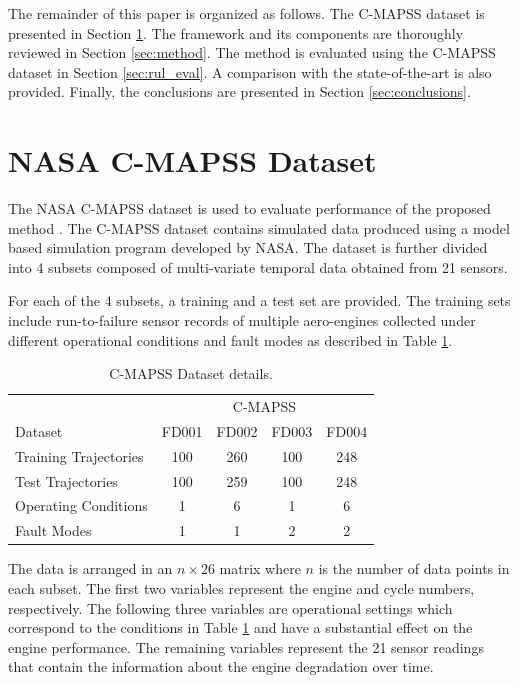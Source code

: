 \documentclass[preprint,12pt]{elsarticle}%
\begin{document}
The remainder of this paper is organized as follows. The C-MAPSS dataset is
presented in Section \ref{sec:rul_dataset}. The framework and its components
are thoroughly reviewed in Section \ref{sec:method}. The method is evaluated
using the C-MAPSS dataset in Section \ref{sec:rul_eval}. A comparison with the
state-of-the-art is also provided. Finally, the conclusions are presented in
Section \ref{sec:conclusions}.

\section{NASA C-MAPSS Dataset}
\label{sec:rul_dataset}

The NASA C-MAPSS dataset is used to evaluate performance of the proposed method
\cite{CMAPS2008}. The C-MAPSS dataset contains simulated data produced using a
model based simulation program developed by NASA. The dataset is further
divided into 4 subsets composed of multi-variate temporal data obtained from
21 sensors.

For each of the 4 subsets, a training and a test set are provided. The training
sets include run-to-failure sensor records of multiple aero-engines collected
under different operational conditions and fault modes as described in Table
\ref{table:CMAPSS}.

\begin{table}[!htb]
\begin{center}
\begin{tabular}
[c]{l|cccc}\hline
& \multicolumn{4}{c}{C-MAPSS}\\
Dataset & FD001 & FD002 & FD003 & FD004\\\hline\hline
Training Trajectories & 100 & 260 & 100 & 248\\
Test Trajectories & 100 & 259 & 100 & 248\\
Operating Conditions & 1 & 6 & 1 & 6\\
Fault Modes & 1 & 1 & 2 & 2\\\hline
\end{tabular}
\caption{C-MAPSS Dataset details.}
\label{table:CMAPSS}
\end{center}
\end{table}


The data is arranged in an $n\times26$ matrix where $n$ is the number of data
points in each subset. The first two variables represent the engine and cycle
numbers, respectively. The following three variables are operational settings
which correspond to the conditions in Table \ref{table:CMAPSS} and have a
substantial effect on the engine performance. The remaining variables
represent the 21 sensor readings that contain the information about the engine
degradation over time.
\end{document}
